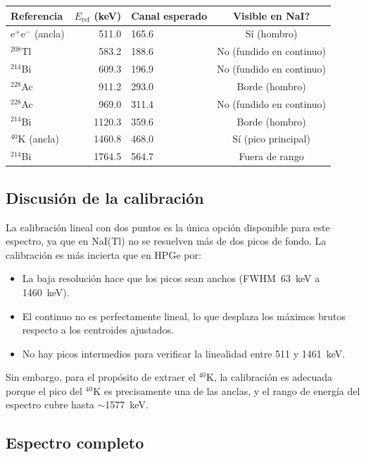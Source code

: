 \documentclass[10pt,a4paper]{article}
\begin{document}
\begin{center}
\begin{tabular}{lrlc}
\hline
Referencia & $E_{\text{ref}}$ (keV) & Canal esperado & Visible en NaI? \\
\hline
e$^+$e$^-$ (ancla) & 511.0 & 165.6 & S\'i (hombro) \\
$^{208}$Tl & 583.2 & 188.6 & No (fundido en continuo) \\
$^{214}$Bi & 609.3 & 196.9 & No (fundido en continuo) \\
$^{228}$Ac & 911.2 & 293.0 & Borde (hombro) \\
$^{228}$Ac & 969.0 & 311.4 & No (fundido en continuo) \\
$^{214}$Bi & 1120.3 & 359.6 & Borde (hombro) \\
$^{40}$K (ancla) & 1460.8 & 468.0 & S\'i (pico principal) \\
$^{214}$Bi & 1764.5 & 564.7 & Fuera de rango \\
\hline
\end{tabular}
\end{center}

\subsection{Discusi\'on de la calibraci\'on}

La calibraci\'on lineal con dos puntos es la \'unica opci\'on disponible para este
espectro, ya que en NaI(Tl) no se resuelven m\'as de dos picos de fondo. La calibraci\'on
es m\'as incierta que en HPGe por:

\begin{itemize}
  \item La baja resoluci\'on hace que los picos sean anchos (FWHM~63~keV a 1460~keV).
  \item El continuo no es perfectamente lineal, lo que desplaza los m\'aximos brutos
        respecto a los centroides ajustados.
  \item No hay picos intermedios para verificar la linealidad entre 511 y 1461~keV.
\end{itemize}

Sin embargo, para el prop\'osito de extraer el $^{40}$K, la calibraci\'on es adecuada
porque el pico del $^{40}$K es precisamente una de las anclas, y el rango de energ\'ia
del espectro cubre hasta $\sim$1577~keV.

\subsection{Espectro completo}
\end{document}
